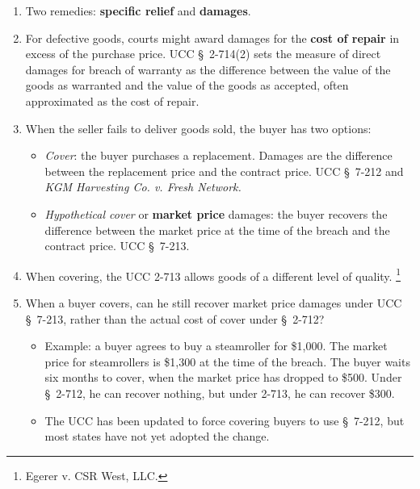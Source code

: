 \begin{enumerate}
\begin{enumerate}
\begin{enumerate}
            \item Two remedies: \textbf{specific relief} and \textbf{damages}.
            \item For defective goods, courts might award damages for the 
            \textbf{cost of repair} in excess of the purchase price.  UCC \S\ 
            2-714(2) sets the measure of direct damages for breach of warranty 
            as the difference between the value of the goods as warranted and 
            the value of the goods as accepted, often approximated as the cost 
            of repair.
            \item When the seller fails to deliver goods sold, the buyer has 
            two options:
            \begin{itemize}
                \item \emph{Cover}: the buyer purchases a replacement. Damages 
                are the difference between the replacement price and the 
                contract price. UCC \S\ 7-212 and \emph{KGM Harvesting Co. v. 
                Fresh Network.}
                \item \emph{Hypothetical cover} or \textbf{market price} 
                damages: the buyer recovers the difference between the market 
                price at the time of the breach and the contract price. UCC 
                \S\ 7-213.
            \end{itemize}
            \item When covering, the UCC 2-713 allows goods of a different 
            level of quality. \footnote{Egerer v. CSR West, LLC.}
            \item When a buyer covers, can he still recover market price 
            damages under UCC \S\ 7-213, rather than the actual cost of cover 
            under \S\ 2-712?
            \begin{itemize}
                \item Example: a buyer agrees to buy a steamroller for 
                \$1,000. The market price for steamrollers is \$1,300 at the 
                time of the breach. The buyer waits six months to cover, when 
                the market price has dropped to \$500. Under \S\ 2-712, he can 
                recover nothing, but under 2-713, he can recover \$300.
                \item The UCC has been updated to force covering buyers to use 
                \S\ 7-212, but most states have not yet adopted the change.
            \end{itemize}

\end{enumerate}
\end{enumerate}
\end{enumerate}
